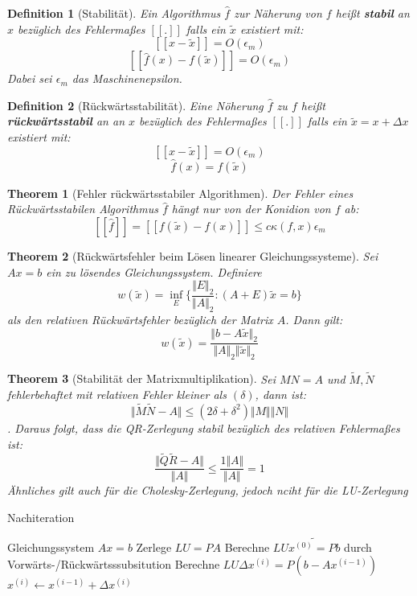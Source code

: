 \documentclass[10pt,a4paper]{article}
\newtheorem{theorem}{Theorem}
\newtheorem{definition}{Definition}
\begin{document}
	\begin{definition}[Stabilität]
		Ein Algorithmus $\hat{f}$ zur Näherung von $f$ heißt \textbf{stabil} an $x$ bezüglich des Fehlermaßes $[[.]]$ falls ein $\tilde{x}$ existiert mit:
		$$[[x-\tilde{x}]] = O(\epsilon_m)$$
		$$[[\hat{f}(x) - f(\tilde{x})]] = O(\epsilon_m)$$
		Dabei sei $\epsilon_m$ das Maschinenepsilon.
	\end{definition}
	\begin{definition}[Rückwärtsstabilität]
		Eine Nöherung $\hat{f}$ zu $f$ heißt \textbf{rückwärtsstabil} an an $x$ bezüglich des Fehlermaßes $[[.]]$ falls ein $\tilde{x} = x+\Delta x$ existiert mit:
		$$[[x-\tilde{x}]] = O(\epsilon_m)$$
		$$\hat{f}(x) = f(\tilde{x})$$
	\end{definition}
	\begin{theorem}[Fehler rückwärtsstabiler Algorithmen]
		Der Fehler eines Rückwärtsstabilen Algorithmus $\hat{f}$ hängt nur von der Konidion von $f$ ab:
		$$[[\hat{f}]] = [[f(\tilde{x})-f(x)]] \leq c\kappa(f, x)\epsilon_m$$
	\end{theorem}
	\begin{theorem}[Rückwärtsfehler beim Lösen linearer Gleichungssysteme]
		Sei $Ax=b$ ein zu lösendes Gleichungssystem. Definiere 
		$$w(\tilde{x}) = \inf_E\{\frac{\Vert E\Vert_2}{\Vert A\Vert_2}: (A+E)\tilde{x}=b\}$$
		als den relativen Rückwärtsfehler bezüglich der Matrix $A$. Dann gilt:
		$$w(\tilde{x})=\frac{\Vert b-A\tilde{x}\Vert_2}{\Vert A\Vert_2\Vert \tilde{x}\Vert_2}$$
	\end{theorem}
	\begin{theorem}[Stabilität der Matrixmultiplikation]
		Sei $MN =A$ und $\tilde{M}, \tilde{N}$ fehlerbehaftet mit relativen Fehler kleiner als $(\delta)$, dann ist:
		$$\Vert \tilde{M}\tilde{N} - A\Vert \leq (2\delta+ \delta^2)\Vert M\Vert\Vert N \Vert$$.
		Daraus folgt, dass die QR-Zerlegung stabil bezüglich des relativen Fehlermaßes ist:
		$$\frac{\Vert \tilde{Q}\tilde{R} - A\Vert}{\Vert A\Vert} \leq \frac{1\Vert A\Vert}{\Vert A\Vert} = 1$$
		Ähnliches gilt auch für die Cholesky-Zerlegung, jedoch nciht für die LU-Zerlegung
	\end{theorem}
	\begin{algorithm}[H]
		\caption{Nachiteration}
		\begin{algorithmic}
			\Require Gleichungssystem $Ax=b$
			\State Zerlege $LU =PA$
			\State Berechne $LU\tilde{x^{(0)}= Pb}$ durch Vorwärts-/Rückwärtsssubsitution
			\State Berechne $LU\Delta x^{(i)} = P(b-Ax^{(i-1)})$
			\State $x^{(i)}\leftarrow x^{(i-1)} + \Delta x^{(i)}$
			\EndFor
		\end{algorithmic}
	\end{algorithm}
\end{document}
